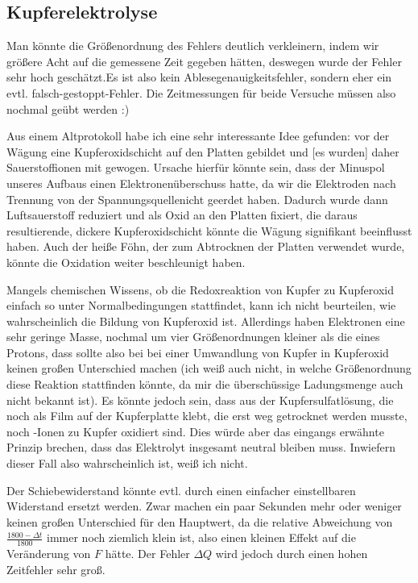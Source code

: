 \subsection{Kupferelektrolyse}
Man könnte die Größenordnung des Fehlers deutlich verkleinern, indem wir größere Acht auf die gemessene Zeit gegeben hätten, deswegen wurde der Fehler sehr hoch geschätzt.Es ist also kein Ablesegenauigkeitsfehler, sondern eher ein evtl. falsch-gestoppt-Fehler. Die Zeitmessungen für beide Versuche müssen also nochmal geübt werden :)

Aus einem Altprotokoll habe ich eine sehr interessante Idee gefunden:
 vor der Wägung eine Kupferoxidschicht auf den Platten gebildet und [es wurden] daher Sauerstoffionen mit gewogen. Ursache hierfür könnte sein, dass der Minuspol unseres Aufbaus einen Elektronenüberschuss hatte, da wir die Elektroden nach Trennung von der Spannungsquellenicht geerdet haben. Dadurch wurde dann Luftsauerstoff reduziert und als Oxid an den Platten fixiert, die daraus resultierende, dickere Kupferoxidschicht könnte die Wägung
signifikant beeinflusst haben. Auch der heiße Föhn, der zum Abtrocknen der Platten verwendet wurde, könnte die Oxidation weiter beschleunigt haben.\grqq{}

Mangels chemischen Wissens, ob die Redoxreaktion von Kupfer zu Kupferoxid einfach so unter Normalbedingungen stattfindet, kann ich nicht beurteilen, wie wahrscheinlich die Bildung von Kupferoxid ist. Allerdings haben Elektronen eine sehr geringe Masse, nochmal um vier Größenordnungen kleiner als die eines Protons, dass sollte also bei bei einer Umwandlung von Kupfer in Kupferoxid keinen großen Unterschied machen (ich weiß auch nicht, in welche Größenordnung diese Reaktion stattfinden könnte, da mir die überschüssige Ladungsmenge auch nicht bekannt ist). Es könnte jedoch sein, dass aus der Kupfersulfatlösung, die noch als Film auf der Kupferplatte klebt, die erst weg getrocknet werden musste, noch -Ionen zu Kupfer oxidiert sind. Dies würde aber das eingangs erwähnte Prinzip brechen, dass das Elektrolyt insgesamt neutral bleiben muss. Inwiefern dieser Fall also wahrscheinlich ist, weiß ich nicht.  

Der Schiebewiderstand könnte evtl. durch einen einfacher einstellbaren Widerstand ersetzt werden. Zwar machen ein paar Sekunden mehr oder weniger keinen großen Unterschied für den Hauptwert, da die relative Abweichung von \(\frac{1800-\Delta t}{1800}\) immer noch ziemlich klein ist, also einen kleinen Effekt auf die Veränderung von \(F\) hätte. Der Fehler \(\Delta Q\) wird jedoch durch einen hohen Zeitfehler sehr groß.

